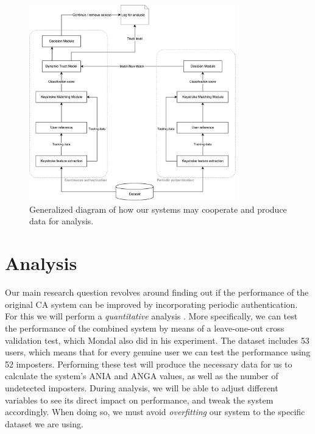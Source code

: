 \documentclass[informationsecurity]{gucmasterproject}
\begin{document}
\begin{figure}[h]
    \centering
    \includegraphics[width=0.8\textwidth]{system-diagram.pdf}
    \caption{Generalized diagram of how our systems may cooperate and produce data for analysis.}
    \label{fig:system-diagram}
\end{figure}


%
    
%

%


\section{Analysis}
Our main research question revolves around finding out if the performance of the original CA system can be improved by incorporating periodic authentication.
For this we will perform a \textit{quantitative} analysis \cite{leedy_ormrod_2013}.
More specifically, we can test the performance of the combined system by means of a leave-one-out cross validation test, which Mondal also did in his experiment.
The dataset includes 53 users, which means that for every genuine user we can test the performance using 52 imposters.
Performing these test will produce the necessary data for us to calculate the system's ANIA and ANGA values, as well as the number of undetected imposters.
During analysis, we will be able to adjust different variables to see its direct impact on performance, and tweak the system accordingly.
When doing so, we must avoid \textit{overfitting} our system to the specific dataset we are using.
\end{document}

